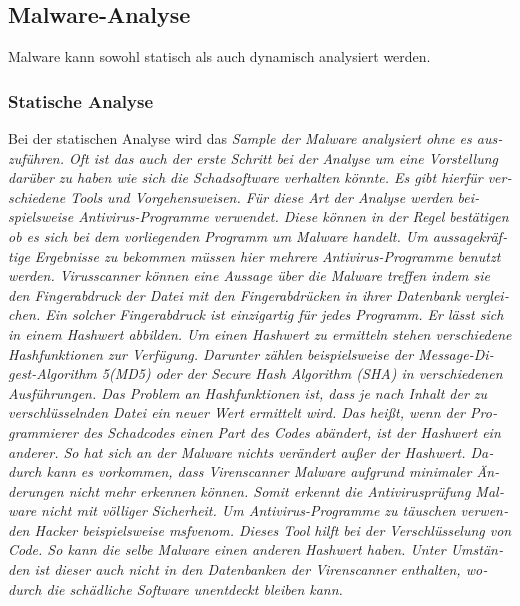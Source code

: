\begin{otherlanguage}{ngerman}
\subsection{Malware-Analyse}
Malware kann sowohl statisch als auch dynamisch analysiert werden.
\subsubsection{Statische Analyse}
Bei der statischen Analyse wird das \it Sample \rm der Malware analysiert ohne es auszuführen. Oft ist das auch der erste Schritt bei der Analyse um eine Vorstellung darüber zu haben wie sich die Schadsoftware verhalten könnte. Es gibt hierfür verschiedene Tools und Vorgehensweisen. 
\newline 
Für diese Art der Analyse werden beispielsweise Antivirus-Programme verwendet. Diese können in der Regel bestätigen ob es sich bei dem vorliegenden Programm um Malware handelt. Um aussagekräftige Ergebnisse zu bekommen müssen hier mehrere Antivirus-Programme benutzt werden. Virusscanner können eine Aussage über die Malware treffen indem sie den \dq Fingerabdruck \dq{} der Datei mit den Fingerabdrücken in ihrer Datenbank vergleichen. Ein solcher \dq Fingerabdruck\dq{} ist einzigartig für jedes Programm. Er lässt sich in einem Hashwert abbilden. Um einen Hashwert zu ermitteln stehen verschiedene Hashfunktionen zur Verfügung. Darunter zählen beispielsweise der \dq Message-Digest-Algorithm 5\dq (MD5) oder der \dq Secure Hash Algorithm\dq{} (SHA) in verschiedenen Ausführungen. Das Problem an Hashfunktionen ist, dass je nach Inhalt der zu verschlüsselnden Datei ein neuer Wert ermittelt wird. Das heißt, wenn der Programmierer des Schadcodes einen Part des Codes abändert, ist der Hashwert ein anderer. So hat sich an der Malware nichts verändert außer der Hashwert. Dadurch kann es vorkommen, dass Virenscanner Malware aufgrund minimaler Änderungen nicht mehr erkennen können. Somit erkennt die Antivirusprüfung Malware nicht mit völliger Sicherheit. Um Antivirus-Programme zu täuschen verwenden Hacker beispielsweise \it msfvenom\rm. Dieses Tool hilft bei der Verschlüsselung von Code. So kann die selbe Malware einen anderen Hashwert haben. Unter Umständen ist dieser auch nicht in den Datenbanken der Virenscanner enthalten, wodurch die schädliche Software unentdeckt bleiben kann.
\newline

\end{otherlanguage}
